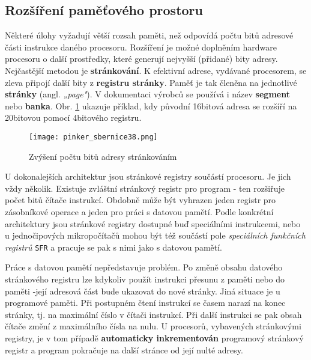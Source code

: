     \subsection{Rozšíření paměťového prostoru}
      Některé úlohy vyžadují větší rozsah paměti, než odpovídá počtu bitů adresové části instrukce 
      daného procesoru. Rozšíření je možné doplněním hardware procesoru o další prostředky, které 
      generují nejvyšší (přidané) bity adresy. Nejčastější metodou je \textbf{stránkování}. K 
      efektivní adrese, vydávané procesorem, se zleva připojí další bity z \textbf{registru 
      stránky}. Paměť je tak členěna na jednotlivé \textbf{stránky} (angl. \emph{„page"}). V 
      dokumentaci výrobců se používá i název \textbf{segment} nebo \textbf{banka}. Obr. 
      \ref{MIT:fig_sbernice38} ukazuje příklad, kdy původní 16bitová adresa se rozšíří 
      na 20bitovou pomocí 4bitového registru.
      
      \begin{figure}[ht!] %
        \centering
        \texttt{[image: pinker\_sbernice38.png]}
        \caption{Zvýšení počtu bitů adresy stránkováním}
        \label{MIT:fig_sbernice38}
      \end{figure}

      U dokonalejších architektur jsou stránkové registry součástí procesoru. Je jich vždy několik. 
      Existuje zvláštní stránkový registr pro program - ten rozšiřuje počet bitů čítače instrukcí. 
      Obdobně může být vyhrazen jeden registr pro zásobníkové operace a jeden pro práci s datovou 
      pamětí. Podle konkrétní architektury jsou stránkové registry dostupné buď speciálními 
      instrukcemi, nebo u jednočipových mikropočítačů mohou být též součástí pole \emph{speciálních 
      funkčních registrů} \texttt{SFR} a pracuje se pak s nimi jako s datovou pamětí.
      
      Práce s datovou pamětí nepředstavuje problém. Po změně obsahu datového stránkového registru 
      lze kdykoliv použít instrukci přesunu z paměti nebo do paměti -její adresová část bude 
      ukazovat do nové stránky. Jiná situace je u programové paměti. Při postupném čtení instrukcí 
      se časem narazí na konec stránky, tj. na maximální číslo v čítači instrukcí. Při další 
      instrukci se pak obsah čítače změní z maximálního čísla na nulu. U procesorů, vybavených 
      stránkovými registry, je v tom případě \textbf{automaticky inkrementován} programový 
      stránkový registr a program pokračuje na další stránce od její nulté adresy.
      
